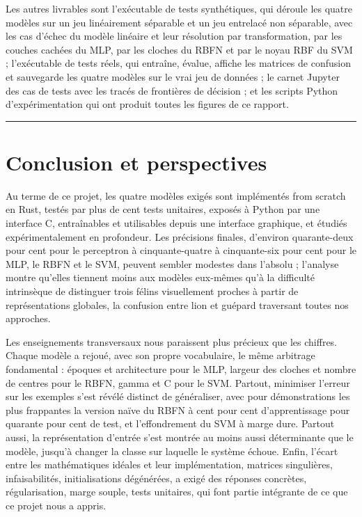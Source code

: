 \documentclass[11pt,a4paper]{report}
\begin{document}
Les autres livrables sont l'exécutable de tests synthétiques, qui
déroule les quatre modèles sur un jeu linéairement séparable et un jeu
entrelacé non séparable, avec les cas d'échec du modèle linéaire et leur
résolution par transformation, par les couches cachées du MLP, par les
cloches du RBFN et par le noyau RBF du SVM ; l'exécutable de tests
réels, qui entraîne, évalue, affiche les matrices de confusion et
sauvegarde les quatre modèles sur le vrai jeu de données ; le carnet
Jupyter des cas de tests avec les tracés de frontières de décision ; et
les scripts Python d'expérimentation qui ont produit toutes les figures
de ce rapport.

\begin{center}\rule{0.5\linewidth}{0.5pt}\end{center}

\hypertarget{conclusion-et-perspectives}{%
\chapter{Conclusion et perspectives}\label{conclusion-et-perspectives}}

Au terme de ce projet, les quatre modèles exigés sont implémentés from
scratch en Rust, testés par plus de cent tests unitaires, exposés à
Python par une interface C, entraînables et utilisables depuis une
interface graphique, et étudiés expérimentalement en profondeur. Les
précisions finales, d'environ quarante-deux pour cent pour le perceptron
à cinquante-quatre à cinquante-six pour cent pour le MLP, le RBFN et le
SVM, peuvent sembler modestes dans l'absolu ; l'analyse montre qu'elles
tiennent moins aux modèles eux-mêmes qu'à la difficulté intrinsèque de
distinguer trois félins visuellement proches à partir de représentations
globales, la confusion entre lion et guépard traversant toutes nos
approches.

Les enseignements transversaux nous paraissent plus précieux que les
chiffres. Chaque modèle a rejoué, avec son propre vocabulaire, le même
arbitrage fondamental : époques et architecture pour le MLP, largeur des
cloches et nombre de centres pour le RBFN, gamma et C pour le SVM.
Partout, minimiser l'erreur sur les exemples s'est révélé distinct de
généraliser, avec pour démonstrations les plus frappantes la version
naïve du RBFN à cent pour cent d'apprentissage pour quarante pour cent
de test, et l'effondrement du SVM à marge dure. Partout aussi, la
représentation d'entrée s'est montrée au moins aussi déterminante que le
modèle, jusqu'à changer la classe sur laquelle le système échoue. Enfin,
l'écart entre les mathématiques idéales et leur implémentation, matrices
singulières, infaisabilités, initialisations dégénérées, a exigé des
réponses concrètes, régularisation, marge souple, tests unitaires, qui
font partie intégrante de ce que ce projet nous a appris.
\end{document}
